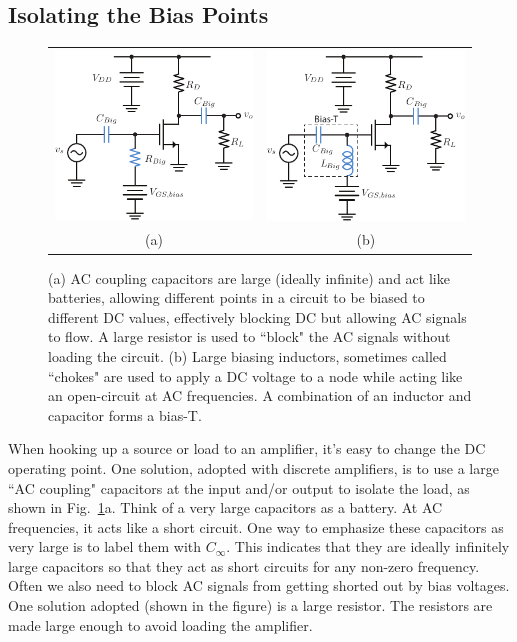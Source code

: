 \subsection{Isolating the Bias Points}

\begin{figure}[tb]
\begin{center}
\begin{tabular}{cc}
\includegraphics[width=.4\columnwidth]{csamp_bias} &
\includegraphics[width=.4\columnwidth]{csamp_biasT} \\
(a) & (b) \\
\end{tabular}
\end{center}
\caption{(a) AC coupling capacitors are large (ideally infinite) and act like batteries, allowing different points in a circuit to be biased to different DC values, effectively blocking DC but allowing AC signals to flow.  A large resistor is used to ``block" the AC signals without loading the circuit.  (b) Large biasing inductors, sometimes called ``chokes" are used to apply a DC voltage to a node while acting like an open-circuit at AC frequencies.  A combination of an inductor and capacitor forms a bias-T.} \label{fig:ac_couple}
\end{figure}

When hooking up a source or load to an amplifier, it's easy to change the DC operating point.  One solution, adopted with discrete amplifiers, is to use a large ``AC coupling" capacitors at the input and/or output to isolate the load, as shown in Fig.~\ref{fig:ac_couple}a. Think of a very large capacitors as a battery. At AC frequencies, it acts like a short circuit.  One way to emphasize these capacitors as very large is to label them with $C_\infty$. This indicates that they are ideally infinitely large capacitors so that they act as short circuits for any non-zero frequency.  Often we also need to block AC signals from getting shorted out by bias voltages.  One solution adopted (shown in the figure) is a large resistor.  The resistors are made large enough to avoid loading the amplifier.
 

